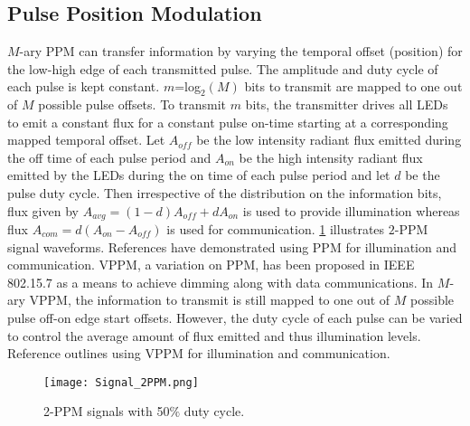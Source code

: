 \subsection{Pulse Position Modulation}
\label{subsec:sisoModulationPPM}
$M$-ary PPM can transfer information by varying the temporal offset (position) for the low-high edge of each transmitted pulse. The amplitude and duty cycle of each pulse is kept constant. $m$=log$^{ }_{2}(M)$ bits to transmit are mapped to one out of $M$ possible pulse offsets. To transmit $m$ bits, the transmitter drives all LEDs to emit a constant flux for a constant pulse on-time starting at a corresponding mapped temporal offset. Let $A_{off}$ be the low intensity radiant flux emitted during the off time of each pulse period and $A_{on}$ be the high intensity radiant flux emitted by the LEDs during the on time of each pulse period and let $d$ be the pulse duty cycle. Then irrespective of the distribution on the information bits, flux given by $A_{avg} = (1-d)A_{off} + dA_{on}$ is used to provide illumination whereas flux $A_{com} = d(A_{on}-A_{off})$ is used for communication. \figurename{ \ref{fig:sisoSig2PPM}} illustrates $2$-PPM signal waveforms. References \cite{bai10a} have demonstrated using PPM for illumination and communication. VPPM, a variation on PPM, has been proposed in IEEE 802.15.7  as a means to achieve dimming along with data communications. In $M$-ary VPPM, the information to transmit is still mapped to one out of $M$ possible pulse off-on edge start offsets. However, the duty cycle of each pulse can be varied to control the average amount of flux emitted and thus illumination levels. Reference \cite{raj12a} outlines using VPPM for illumination and communication.
\begin{figure}[t]
	\centering
		\texttt{[image: Signal\_2PPM.png]}
		\caption{2-PPM signals with 50$\%$ duty cycle.}
		\label{fig:sisoSig2PPM}
\end{figure}


